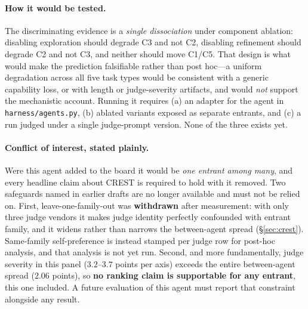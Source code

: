 \paragraph{How it would be tested.} The discriminating evidence is a \emph{single dissociation}
under component ablation: disabling exploration should degrade C3 and not C2, disabling refinement
should degrade C2 and not C3, and neither should move C1/C5. That design is what would make the
prediction falsifiable rather than post hoc---a uniform degradation across all five task types
would be consistent with a generic capability loss, or with length or judge-severity artifacts, and
would \emph{not} support the mechanistic account. Running it requires (a) an adapter for the agent
in \texttt{harness/agents.py}, (b) ablated variants exposed as separate entrants, and (c) a run
judged under a single judge-prompt version. None of the three exists yet.

\paragraph{Conflict of interest, stated plainly.} Were this agent added to the board it would be
\emph{one entrant among many}, and every headline claim about CREST is required to hold with it
removed. Two safeguards named in earlier drafts are no longer available and must not be relied on.
First, leave-one-family-out was \textbf{withdrawn} after measurement: with only three judge vendors
it makes judge identity perfectly confounded with entrant family, and it widens rather than narrows
the between-agent spread (\S\ref{sec:crest}). Same-family self-preference is instead stamped per
judge row for post-hoc analysis, and that analysis is not yet run. Second, and more fundamentally,
judge severity in this panel ($3.2$--$3.7$ points per axis) exceeds the entire between-agent spread
($2.06$ points), so \textbf{no ranking claim is supportable for any entrant}, this one included. A
future evaluation of this agent must report that constraint alongside any result.
